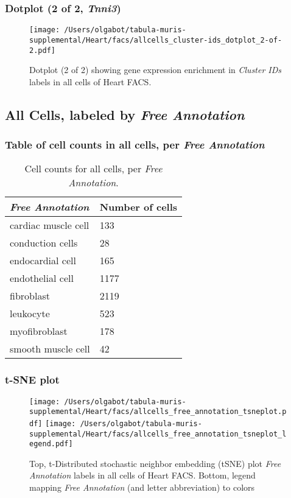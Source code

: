 \clearpage

\subsubsection{Dotplot (2 of 2, \emph{Tnni3})}
\begin{figure}[h]
\centering
\texttt{[image: /Users/olgabot/tabula-muris-supplemental/Heart/facs/allcells\_cluster-ids\_dotplot\_2-of-2.pdf]}

\caption{ Dotplot (2 of 2)  showing gene expression enrichment in \emph{Cluster IDs} labels in all cells of Heart FACS. }
\end{figure}


\clearpage

\subsection{All Cells, labeled by \emph{Free Annotation}}
\subsubsection{Table of cell counts in all cells, per \emph{Free Annotation}}\begin{table}[h]
\centering
\label{my-label}
\begin{tabular}{@{}ll@{}}
\toprule

\emph{Free Annotation}& Number of cells \\ \midrule
cardiac muscle cell & 133 \\

conduction cells & 28 \\

endocardial cell & 165 \\

endothelial cell & 1177 \\

fibroblast & 2119 \\

leukocyte & 523 \\

myofibroblast & 178 \\

smooth muscle cell & 42 \\
\bottomrule
\end{tabular}
\caption{Cell counts for all cells, per \emph{Free Annotation}.}
\end{table}

\clearpage
\subsubsection{t-SNE plot}
\begin{figure}[h]
\centering
\texttt{[image: /Users/olgabot/tabula-muris-supplemental/Heart/facs/allcells\_free\_annotation\_tsneplot.pdf]}
\texttt{[image: /Users/olgabot/tabula-muris-supplemental/Heart/facs/allcells\_free\_annotation\_tsneplot\_legend.pdf]}
\caption{Top, t-Distributed stochastic neighbor embedding (tSNE) plot  \emph{Free Annotation} labels in all cells of Heart FACS. Bottom, legend mapping \emph{Free Annotation} (and letter abbreviation) to colors}
\end{figure}


